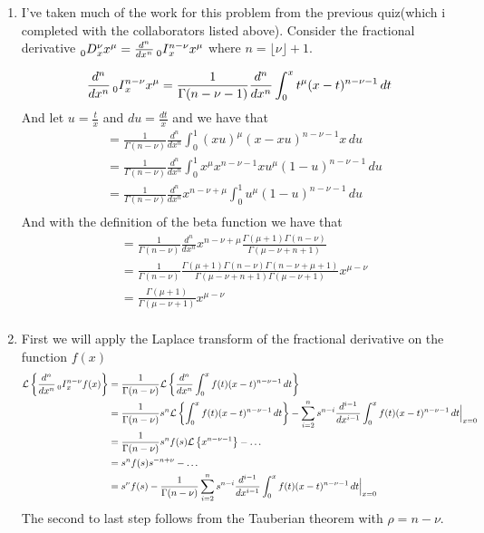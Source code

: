 \documentclass[12pt]{amsart}
\theoremstyle{definition}
\begin{document}
\begin{enumerate}
    \item I've taken much of the work for this problem from the previous quiz(which i completed with the collaborators listed above). Consider the fractional derivative $\prescript{}{0}{D}^{\nu}_{x} x^\mu=\frac{d^n}{dx^n}\prescript{}{0}{I}^{n-\nu}_{x}x^\mu$ where $n=\lfloor\nu\rfloor+1$.

    \begin{align*}
        \frac{d^n}{dx^n}\prescript{}{0}{I}^{n-\nu}_{x}x^\mu &= \frac{1}{\Gamma(n-\nu-1)}\frac{d^n}{dx^n}\int_{0}^x t^\mu(x-t)^{n-\nu-1}\,dt\\
    \end{align*}
    And let $u=\frac{t}{x}$ and $du=\frac{dt}{x}$ and we have that
    \begin{align*}
        &= \frac{1}{\Gamma(n-\nu)}\frac{d^n}{dx^n}\int_{0}^1 (xu)^\mu(x-xu)^{n-\nu-1}x\,du\\
        &= \frac{1}{\Gamma(n-\nu)}\frac{d^n}{dx^n}\int_{0}^1 x^\mu x^{n-\nu-1}x u^\mu (1-u)^{n-\nu-1}\,du\\
        &= \frac{1}{\Gamma(n-\nu)}\frac{d^n}{dx^n}x^{n-\nu+\mu}\int_{0}^1 u^\mu (1-u)^{n-\nu-1}\,du\\
    \end{align*}
    And with the definition of the beta function we have that 
    \begin{align*}
        &= \frac{1}{\Gamma(n-\nu)}\frac{d^n}{dx^n}x^{n-\nu+\mu}\frac{\Gamma(\mu+1)\Gamma(n-\nu)}{\Gamma(\mu-\nu+n+1)}\\
        &= \frac{1}{\Gamma(n-\nu)}\frac{\Gamma(\mu+1)\Gamma(n-\nu)\Gamma(n-\nu+\mu+1)}{\Gamma(\mu-\nu+n+1)\Gamma(\mu-\nu+1)} x^{\mu-\nu}\\
        &= \frac{\Gamma(\mu+1)}{\Gamma(\mu-\nu+1)} x^{\mu-\nu}\\ 
    \end{align*}

    \item First we will apply the Laplace transform of the fractional derivative on the function $f(x)$
    \begin{align*}
        \mathcal{L}\left\{\frac{d^n}{dx^n}\prescript{}{0}{I}^{n-\nu}_{x}f(x)\right\} &= \frac{1}{\Gamma(n-\nu)}\mathcal{L}\left\{\frac{d^n}{dx^n}\int_{0}^x f(t)(x-t)^{n-\nu-1}\,dt\right\}\\
        &=\frac{1}{\Gamma(n-\nu)}s^n\mathcal{L}\left\{\int_{0}^x f(t)(x-t)^{n-\nu-1}\,dt\right\}-\sum_{i=2}^n s^{n-i}\frac{d^{i-1}}{d x^{i-1}} \int_{0}^x f(t)(x-t)^{n-\nu-1}\,dt\Big\vert_{x=0}\\
        &=\frac{1}{\Gamma(n-\nu)}s^n f(s)\mathcal{L}\left\{x^{n-\nu-1}\right\}-\dots\\
        &=s^n f(s)s^{-n+\nu} -\dots \\
        &= s^\nu f(s) -\frac{1}{\Gamma(n-\nu)}\sum_{i=2}^n s^{n-i}\frac{d^{i-1}}{d x^{i-1}} \int_{0}^x f(t)(x-t)^{n-\nu-1}\,dt\Big\vert_{x=0}
    \end{align*}
    The second to last step follows from the Tauberian theorem with $\rho=n-\nu$. %


\end{enumerate}
\end{document}
